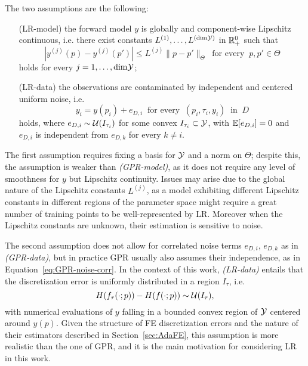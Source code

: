 The two assumptions are the following:
\begin{itemize}[font=\itshape, leftmargin=1.5cm, align=right, labelwidth=2.4cm]
    \item[(LR-model)] the forward model $y$ is globally and component-wise Lipschitz continuous, i.e. there exist constants $L^{(1)},\dots, L^{(\text{dim}\mathcal Y)}$ in $\mathbb{R}_+^0$ such that 
    \[
        |y^{(j)}(p) - y^{(j)}(p')| \leq L^{(j)} \|p - p'\|_\Theta \ \text{ for every } \ p, p' \in \Theta
    \]
    holds for every $j = 1, \dots, \text{dim}\mathcal Y$;
    \item[(LR-data)] the observations are contaminated by independent and centered uniform noise, i.e. 
    \[ 
        y_i = y(p_i) + e_{D,i} \ \text{ for every } \ (p_i,\tau_i,y_i) \ \text{ in } \ D
    \] 
    holds, where $e_{D,i} \sim \mathcal U(I_{\tau_i})$ for some convex $I_{\tau_i} \subset \mathcal Y$, with $\mathbb E[e_{D,i}] = 0$ and $e_{D,i}$ is independent from $e_{D,k}$ for every $k \neq i$.
\end{itemize}  
The first assumption requires fixing a basis for $\mathcal Y$ and a norm on $\Theta$; despite this, the assumption is weaker than \textit{(GPR-model)}, as it does not require any level of smoothness for $y$ but Lipschitz continuity. \newline
Issues may arise due to the global nature of the Lipschitz constants $L^{(j)}$, as a model exhibiting different Lipschitz constants in different regions of the parameter space might require a great number of training points to be well-represented by LR. 
Moreover when the Lipschitz constants are unknown, their estimation is sensitive to noise.

The second assumption does not allow for correlated noise terms $e_{D,i}$, $e_{D,k}$ as in \textit{(GPR-data)}, but in practice GPR usually also assumes their independence, as in Equation~\ref{eq:GPR-noise-corr}. 
In the context of this work, \textit{(LR-data)} entails that the discretization error is uniformly distributed in a region $I_\tau$, i.e. 
\[
    H(f_{\tau}(\cdot; p)) - H(f(\cdot; p)) \sim \mathcal U(I_\tau),
\] 
with numerical evaluations of $y$ falling in a bounded convex region of $\mathcal Y$ centered around $y(p)$. \newline
Given the structure of FE discretization errors and the nature of their estimators described in Section~\ref{sec:AdaFE}, this assumption is more realistic than the one of GPR, and it is the main motivation for considering LR in this work. \medbreak

